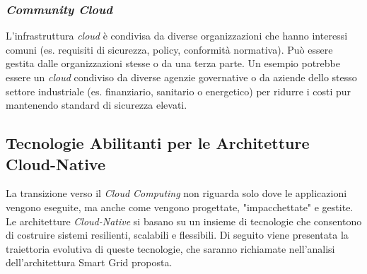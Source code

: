 \subsubsection{\textit{Community Cloud}}
L'infrastruttura \textit{cloud} è condivisa da diverse organizzazioni che hanno interessi comuni (es. requisiti di sicurezza, policy, conformità normativa). Può essere gestita dalle organizzazioni stesse o da una terza parte. Un esempio potrebbe essere un \textit{cloud} condiviso da diverse agenzie governative o da aziende dello stesso settore industriale (es. finanziario, sanitario o energetico) per ridurre i costi pur mantenendo standard di sicurezza elevati.


\subsection{Tecnologie Abilitanti per le Architetture Cloud-Native}


La transizione verso il \textit{Cloud Computing} non riguarda solo dove le applicazioni vengono eseguite, ma anche come vengono progettate, "impacchettate" e gestite. Le architetture \textit{Cloud-Native} si basano su un insieme di tecnologie che consentono di costruire sistemi resilienti, scalabili e flessibili. Di seguito viene presentata la traiettoria evolutiva di queste tecnologie, che saranno richiamate nell'analisi dell'architettura Smart Grid proposta.




